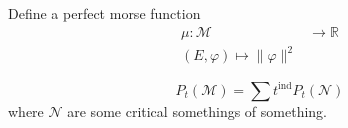 Define a perfect morse function 
\begin{align}
    \mu : \mathcal{M} & \rightarrow  \mathbb{R} \\
    (E, \varphi)  \mapsto \| \varphi \| ^ 2 
\end{align}

\begin{equation}
    P _t ( \mathcal{M}) = \sum t ^{\mathrm{ind}} P _t ( \mathcal{N}) 
\end{equation}
where $\mathcal{N} $ are some critical somethings of something. 














 

